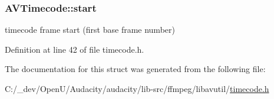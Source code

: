 \subsubsection[{\texorpdfstring{start}{start}}]{ A\+V\+Timecode\+::start}\hypertarget{struct_a_v_timecode_af467d05fd293b6206e635e453b1f524a}{}\label{struct_a_v_timecode_af467d05fd293b6206e635e453b1f524a}


timecode frame start (first base frame number) 



Definition at line 42 of file timecode.\+h.



The documentation for this struct was generated from the following file\+:\begin{DoxyCompactItemize}
\item 
C\+:/\+\_\+dev/\+Open\+U/\+Audacity/audacity/lib-\/src/ffmpeg/libavutil/\hyperlink{timecode_8h}{timecode.\+h}\end{DoxyCompactItemize}
